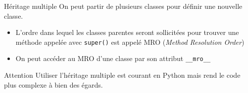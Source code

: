 \begin{frame}{Héritage multiple}
  On peut partir de plusieurs classes pour définir une nouvelle classe.

  \begin{itemize}
    \item L'ordre dans lequel les classes parentes seront sollicitées pour trouver une méthode appelée avec \texttt{super()} est appelé MRO (\textit{Method Resolution Order})
    \item On peut accéder au MRO d'une classe par son attribut \texttt{\_\_mro\_\_}
  \end{itemize}

  \begin{alertblock}{Attention}
    Utiliser l'héritage multiple est courant en Python mais rend le code plus complexe à bien des égards.
  \end{alertblock}
\end{frame}
